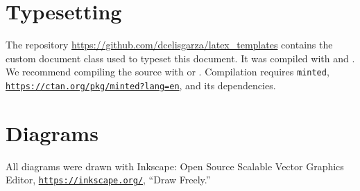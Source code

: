 \section{Typesetting}
\label{s:typeset}

The repository \href{https://github.com/dcelisgarza/latex_templates}{https://github.com/dcelisgarza/latex\_templates} contains the custom document class used to typeset this document. It was compiled with  and . We recommend compiling the source with  or . Compilation requires \texttt{minted}, \href{https://ctan.org/pkg/minted?lang=en}{\texttt{https://ctan.org/pkg/minted?lang=en}}, and its dependencies.
\section{Diagrams}
\label{s:diag}

All diagrams were drawn with Inkscape: Open Source Scalable Vector Graphics Editor, \href{https://inkscape.org/}{\texttt{https://inkscape.org/}}, ``Draw Freely.''
\savearabiccounter
